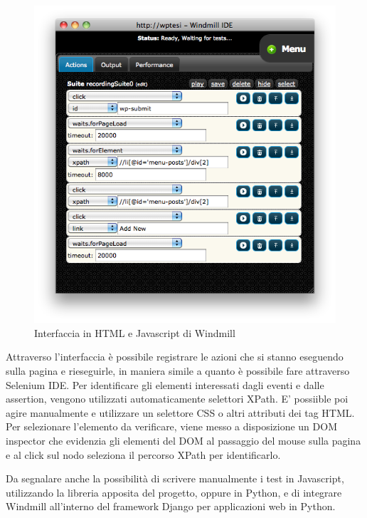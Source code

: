 \begin{figure}[htbp]
\begin{center}
\includegraphics[width=\textwidth]{images/windmill_screen.png}
\caption{Interfaccia in HTML e Javascript di Windmill}
\label{fig:windmillScreen}
\end{center}
\end{figure}

Attraverso l'interfaccia è possibile registrare le azioni che si stanno eseguendo sulla pagina e rieseguirle, in maniera simile a quanto è possibile fare attraverso Selenium IDE. Per identificare gli elementi interessati dagli eventi e dalle assertion, vengono utilizzati automaticamente selettori XPath. E' possiible poi agire manualmente e utilizzare un selettore CSS o altri attributi dei tag HTML. Per selezionare l'elemento da verificare, viene messo a disposizione un DOM inspector che evidenzia gli elementi del DOM al passaggio del mouse sulla pagina e al click sul nodo seleziona il percorso XPath per identificarlo.

Da segnalare anche la possibilità di scrivere manualmente i test in Javascript, utilizzando la libreria apposita del progetto, oppure in Python, e di integrare Windmill all'interno del framework Django per applicazioni web in Python.

